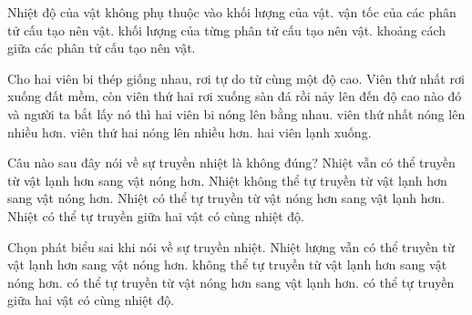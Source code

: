 \begin{ex}
Nhiệt độ của vật không phụ thuộc vào
\choice
{khối lượng của vật.}
{vận tốc của các phân tử cấu tạo nên vật.}
{khối lượng của từng phân tử cấu tạo nên vật.}
{\True khoảng cách giữa các phân tử cấu tạo nên vật.}
\end{ex}


\begin{ex}
Cho hai viên bi thép giống nhau, rơi tự do từ cùng một độ cao. Viên thứ nhất rơi xuống đất mềm, còn viên thứ hai rơi xuống sàn đá rồi nảy lên đến độ cao nào đó và người ta bắt lấy nó thì
\choice
{hai viên bi nóng lên bằng nhau.}
{\True viên thứ nhất nóng lên nhiều hơn.}
{viên thứ hai nóng lên nhiều hơn.}
{hai viên lạnh xuống.}
\end{ex}


\begin{ex}
Câu nào sau đây nói về sự truyền nhiệt là không đúng?
\choice
{Nhiệt vẫn có thể truyền từ vật lạnh hơn sang vật nóng hơn.}
{Nhiệt không thể tự truyền từ vật lạnh hơn sang vật nóng hơn.}
{Nhiệt có thể tự truyền từ vật nóng hơn sang vật lạnh hơn.}
{\True Nhiệt có thể tự truyền giữa hai vật có cùng nhiệt độ.}
\end{ex}

\begin{ex}
Chọn phát biểu sai khi nói về sự truyền nhiệt. Nhiệt lượng
\choice
{vẫn có thể truyền từ vật lạnh hơn sang vật nóng hơn.}
{không thể tự truyền từ vật lạnh hơn sang vật nóng hơn.}
{có thể tự truyền từ vật nóng hơn sang vật lạnh hơn.}
{\True có thể tự truyền giữa hai vật có cùng nhiệt độ.}
\end{ex}

